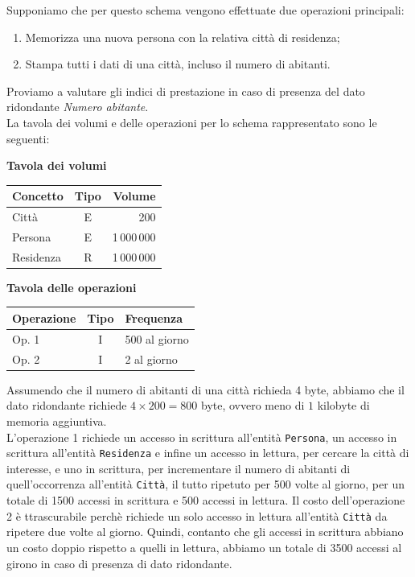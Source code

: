 \documentclass[12pt]{report}
\begin{document}
	Supponiamo che per questo schema vengono effettuate due operazioni principali:
	\begin{enumerate}
		\item Memorizza una nuova persona con la relativa città di residenza;
		\item Stampa tutti i dati di una città, incluso il numero di abitanti.
	\end{enumerate}
	Proviamo a valutare gli indici di prestazione in caso di presenza del dato ridondante \textit{Numero abitante}. \\
	La tavola dei volumi e delle operazioni per lo schema rappresentato sono le seguenti:
	\begin{center}
		\begin{minipage}{0.45\textwidth}
		\centering
		\textbf{Tavola dei volumi}

		\vspace{0.5cm}

		\begin{tabular}{|l|c|r|}
		\hline
		\textbf{Concetto} & \textbf{Tipo} & \textbf{Volume} \\
		\hline
		Città & E & 200 \\
		\hline
		Persona & E & 1\,000\,000 \\
		\hline
		Residenza & R & 1\,000\,000 \\
		\hline
		\end{tabular}
		\end{minipage}
		\hfill
		\begin{minipage}{0.45\textwidth}
		\centering
		\textbf{Tavola delle operazioni}

		\vspace{0.5cm}

		\begin{tabular}{|l|c|l|}
		\hline
		\textbf{Operazione} & \textbf{Tipo} & \textbf{Frequenza} \\
		\hline
		Op. 1 & I & 500 al giorno \\
		\hline
		Op. 2 & I & 2 al giorno \\
		\hline
		\end{tabular}
		\end{minipage}
	\end{center}
	Assumendo che il numero di abitanti di una città richieda 4 byte, abbiamo che il dato ridondante richiede $4 \times 200 = 800$ byte, ovvero meno di $1$ kilobyte di memoria aggiuntiva. \\
	L'operazione 1 richiede un accesso in scrittura all'entità \texttt{Persona}, un accesso in scrittura all'entità \texttt{Residenza} e infine un accesso in lettura, per cercare la città di interesse, e uno in scrittura, per incrementare il numero di abitanti di quell'occorrenza all'entità \texttt{Città}, il tutto ripetuto per 500 volte al giorno, per un totale di 1500 accessi in scrittura e 500 accessi in lettura. Il costo dell'operazione 2 è ttrascurabile perchè richiede un solo accesso in lettura all'entità \texttt{Città} da ripetere due volte al giorno. Quindi, contanto che gli accessi in scrittura abbiano un costo doppio rispetto a quelli in lettura, abbiamo un totale di 3500 accessi al girono in caso di presenza di dato ridondante. \\
\end{document}
